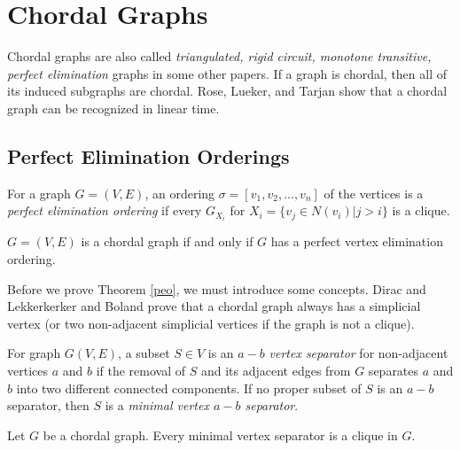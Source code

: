 \section{Chordal Graphs}
\label{chordal}
Chordal graphs are also called \emph{triangulated, rigid circuit, monotone transitive, perfect elimination} graphs in some other papers.
If a graph is chordal, then all of its induced subgraphs are chordal. Rose, Lueker, and Tarjan\cite{rose1976algorithmic} show that a chordal graph can be recognized in linear time.

\subsection{Perfect Elimination Orderings}

\begin{definition}
\label{def_peo}
For a graph $G = (V, E)$, an ordering $ \sigma = [v_1, v_2, ..., v_n] $ of the vertices is a \emph{perfect elimination ordering} if every $ G_{X_i} $ for $ X_i = \{v_{j} \in N( v_{i} )|j>i\} $ is a clique.
\end{definition}

\begin{theorem}
\cite{rose1976algorithmic}
\label{peo}
$G = (V, E)$ is a chordal graph if and only if $G$ has a perfect vertex elimination ordering. 
\end{theorem}

Before we prove Theorem \ref{peo}, we must introduce some concepts. Dirac\cite{dirac1961rigid} and Lekkerkerker and Boland\cite{lekkerkerker1962representation} prove that a chordal graph always has a simplicial vertex (or two non-adjacent simplicial vertices if the graph is not a clique). 

\begin{definition}
For graph $G(V,E)$, a subset $S\in V$ is an $a-b$ \emph{vertex separator} for non-adjacent vertices $a$ and $b$ if the removal of $S$ and its adjacent edges from $G$ separates $a$ and $b$ into two different connected components. If no proper subset of $S$ is an $a-b$ separator, then $S$ is a \emph{minimal vertex $a-b$ separator}.
\end{definition}

\begin{lemma}
\label{lemma_separator}
Let $G$ be a chordal graph. Every minimal vertex separator is a clique in $G$.
\end{lemma}

